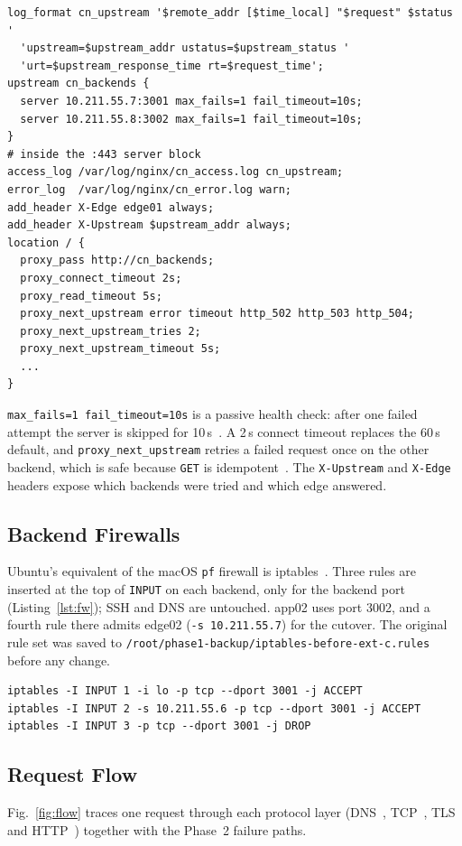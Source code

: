 \documentclass[conference,a4paper]{IEEEtran}
\newcommand{\cmd}[1]{\texttt{\small #1}}
\begin{document}
\begin{lstlisting}[caption={Phase~2 additions to the nginx site on edge01},label={lst:nginx}]
log_format cn_upstream '$remote_addr [$time_local] "$request" $status '
  'upstream=$upstream_addr ustatus=$upstream_status '
  'urt=$upstream_response_time rt=$request_time';
upstream cn_backends {
  server 10.211.55.7:3001 max_fails=1 fail_timeout=10s;
  server 10.211.55.8:3002 max_fails=1 fail_timeout=10s;
}
# inside the :443 server block
access_log /var/log/nginx/cn_access.log cn_upstream;
error_log  /var/log/nginx/cn_error.log warn;
add_header X-Edge edge01 always;
add_header X-Upstream $upstream_addr always;
location / {
  proxy_pass http://cn_backends;
  proxy_connect_timeout 2s;
  proxy_read_timeout 5s;
  proxy_next_upstream error timeout http_502 http_503 http_504;
  proxy_next_upstream_tries 2;
  proxy_next_upstream_timeout 5s;
  ...
}
\end{lstlisting}

\cmd{max\_fails=1 fail\_timeout=10s} is a passive health check: after one failed attempt the server is skipped for
10\,s~\cite{nginxup}. A 2\,s connect timeout replaces the 60\,s default, and \cmd{proxy\_next\_upstream} retries a failed
request once on the other backend, which is safe because \cmd{GET} is idempotent~\cite{rfc9110}. The \cmd{X-Upstream}
and \cmd{X-Edge} headers expose which backends were tried and which edge answered.

\subsection{Backend Firewalls}
Ubuntu's equivalent of the macOS \cmd{pf} firewall is iptables~\cite{iptables}. Three rules are inserted at the top of
\cmd{INPUT} on each backend, only for the backend port (Listing~\ref{lst:fw}); SSH and DNS are untouched. app02 uses port 3002, and a fourth rule there admits edge02
(\cmd{-s 10.211.55.7}) for the cutover. The original rule set was saved to
\cmd{/root/phase1-backup/iptables-before-ext-c.rules} before any change.

\begin{lstlisting}[caption={Service-isolation rules on app01},label={lst:fw}]
iptables -I INPUT 1 -i lo -p tcp --dport 3001 -j ACCEPT
iptables -I INPUT 2 -s 10.211.55.6 -p tcp --dport 3001 -j ACCEPT
iptables -I INPUT 3 -p tcp --dport 3001 -j DROP
\end{lstlisting}

\subsection{Request Flow}
Fig.~\ref{fig:flow} traces one request through each protocol layer (DNS~\cite{rfc1035}, TCP~\cite{rfc9293}, TLS~\cite{rfc8446} and HTTP~\cite{rfc9110}) together with the Phase~2 failure paths.
\end{document}
